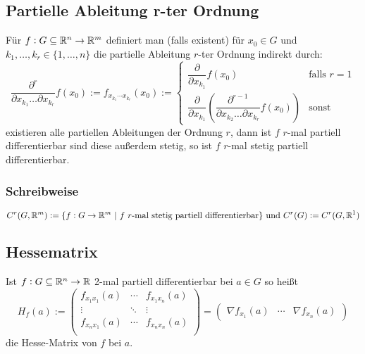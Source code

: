 \subsection{Partielle Ableitung r-ter Ordnung}
Für $f: G \subseteq \mathbb{R}^n \rightarrow \mathbb{R}^m$ definiert man (falls existent) für
$x_0 \in G$ und $k_1, \ldots, k_r \in \{ 1, \ldots, n \}$ die partielle Ableitung
$r$-ter Ordnung indirekt durch:
\begin{equation*}
    \frac{\partial^r}{\partial x_{k_1} \ldots \partial x_{k_r}} f(x_0) :=
    f_{x_{k_1} \cdots x_{k_r}} (x_0) :=
    \begin{cases}
        \dfrac{\partial}{\partial x_{k_1}} f(x_0) & \text{falls } r=1\\
        \dfrac{\partial}{\partial x_{k_1}} \left(
        \dfrac{\partial^{r-1}}{\partial x_{k_2} \ldots \partial x_{k_r}} f(x_0)
        \right) & \text{sonst}
    \end{cases}
\end{equation*}
existieren alle partiellen Ableitungen der Ordnung $r$, dann ist $f$ $r$-mal
partiell differentierbar sind diese außerdem stetig, so ist $f$ $r$-mal stetig
partiell differentierbar.

\subsubsection{Schreibweise}
\begin{equation*}
    C^r(G, \mathbb{R}^m) := \{ f: G \rightarrow \mathbb{R}^m\ \vert \ f\ r\text{-mal stetig
    partiell differentierbar}\}\text{ und }
    C^r(G) := C^r(G, \mathbb{R}^1)
\end{equation*}

\subsection{Hessematrix}
Ist $f: G \subseteq \mathbb{R}^n \rightarrow \mathbb{R}$ 2-mal partiell differentierbar bei
$a \in G$ so heißt
\begin{equation*}
    H_f(a) :=
    \begin{pmatrix}
        f_{x_1 x_1}(a) & \cdots & f_{x_1 x_n}(a)\\
        \vdots & \ddots & \vdots \\
        f_{x_n x_1}(a) & \cdots & f_{x_n x_n}(a) \\
    \end{pmatrix}
    =
    \begin{pmatrix}
        \nabla f_{x_1}(a) & \cdots & \nabla f_{x_n}(a)
    \end{pmatrix}
\end{equation*}
die Hesse-Matrix von $f$ bei $a$.


